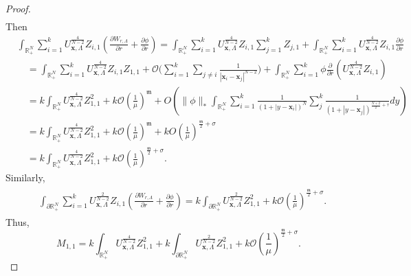 \documentclass[10pt,a4paper]{amsart}
\begin{document}
\begin{proof}
\begin{align*}
  \end{align*}
  Then
$$
  \begin{aligned}
&\int_{\mathbb{R}_{+}^{N}}\sum_{i=1}^{k} U_{\mathbf{x},\Lambda}^{\frac{4}{N-2}} Z_{i,1}\left(\frac{\partial W_{r,\Lambda}}{\partial r}+\frac{\partial \phi}{\partial r}\right)=  \int_{\mathbb{R}_{+}^{N}}\sum_{i=1}^{k} U_{\mathbf{x},\Lambda}^{\frac{4}{N-2}} Z_{i,1}\sum_{j=1}^{k}Z_{j,1}+ \int_{\mathbb{R}_{+}^{N}}\sum_{i=1}^{k} U_{\mathbf{x},\Lambda}^{\frac{4}{N-2}} Z_{i,1}\frac{\partial \phi}{\partial r}\\
  &\quad = \int_{\mathbb{R}_{+}^{N}}\sum_{i=1}^{k} U_{\mathbf{x},\Lambda}^{\frac{4}{N-2}} Z_{i,1}Z_{1,1}+\mathcal O\Biggl(\sum_{i=1}^{k}\sum_{j\neq i} \frac{1}{|\mathbf{x}_i-\mathbf{x}_{j}|^{N-2}}\Biggr) + \int_{\mathbb{R}_{+}^{N}}\sum_{i=1}^{k}\phi \frac{\partial }{\partial r}\left(U_{\mathbf{x},\Lambda}^{\frac{4}{N-2}} Z_{i,1}\right)\\
  &\quad = k \int_{\mathbb{R}_{+}^{N}} U_{\mathbf{x},\Lambda}^{\frac{4}{N-2}} Z_{1,1}^2 + k \mathcal O\left(\frac{1}{\mu}\right)^{\mathfrak m} + O\left(\|\phi\|_{*}\int_{\mathbb{R}_{+}^{N}}\sum_{i=1}^{k}\frac{1}{(1+|y-\mathbf{x}_{i}|)^{N}}\sum_{j}^{k} \frac{1}{(1+|y-\mathbf{x}_{j}|)^{\frac{N+2}{2}+\tau}} d y\right)\\
  &\quad =  k \int_{\mathbb{R}_{+}^{N}} U_{\mathbf{x},\Lambda}^{\frac{4}{N-2}} Z_{1,1}^2+ k \mathcal O\left(\frac{1}{\mu}\right)^{\mathfrak m} + kO\left(\frac{1}{\mu}\right)^{\frac{\mathfrak m}{2}+\sigma} \\
  &\quad = k \int_{\mathbb{R}_{+}^{N}} U_{\mathbf{x},\Lambda}^{\frac{4}{N-2}} Z_{1,1}^2 + k\mathcal O\left(\frac{1}{\mu}\right)^{\frac{\mathfrak m}{2}+\sigma}.
  \end{aligned}
$$
Similarly,
\begin{align*}
  \begin{aligned}
    &\int_{\partial\mathbb{R}_{+}^{N}}\sum_{i=1}^{k} U_{\mathbf{x},\Lambda}^{\frac{2}{N-2}} Z_{i,1}\left(\frac{\partial W_{r,\Lambda}}{\partial r}+\frac{\partial \phi}{\partial r}\right)=   k \int_{\partial\mathbb{R}_{+}^{N}} U_{\mathbf{x},\Lambda}^{\frac{2}{N-2}} Z_{1,1}^2 + k\mathcal O\left(\frac{1}{\mu}\right)^{\frac{\mathfrak m}{2}+\sigma}.
\end{aligned}
\end{align*}
Thus, 
\[M_{1,1}= k \int_{\mathbb{R}_{+}^{N}} U_{\mathbf{x},\Lambda}^{\frac{4}{N-2}} Z_{1,1}^2 + k \int_{\partial\mathbb{R}_{+}^{N}} U_{\mathbf{x},\Lambda}^{\frac{2}{N-2}} Z_{1,1}^2 + k\mathcal O\left(\frac{1}{\mu}\right)^{\frac{\mathfrak m}{2}+\sigma}.\]

\end{proof}
\end{document}

